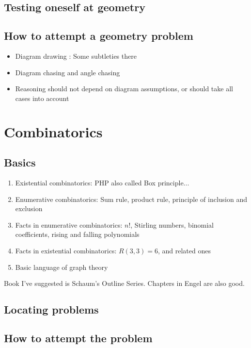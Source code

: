 \documentclass[a4paper]{amsart}
\begin{document}
\subsection{Testing oneself at geometry}


\subsection{How to attempt a geometry problem}

\begin{itemize}
\item Diagram drawing : Some subtleties there

\item Diagram chasing and angle chasing

\item Reasoning should not depend on diagram assumptions, or should take all cases into account

\end{itemize}

\section{Combinatorics}

\subsection{Basics}

\begin{enumerate}

\item Existential combinatorics: PHP also called Box principle...

\item Enumerative combinatorics: Sum rule, product rule, principle of inclusion and exclusion

\item Facts in enumerative combinatorics: $n!$, Stirling numbers, binomial coefficients, rising and falling polynomials

\item Facts in existential combinatorics: $R(3,3)=6$, and related ones

\item Basic language of graph theory

\end{enumerate}

Book I've suggested is Schaum's Outline Series. Chapters in Engel are also good.

\subsection{Locating problems}



\subsection{How to attempt the problem}










\printindex
\end{document}

